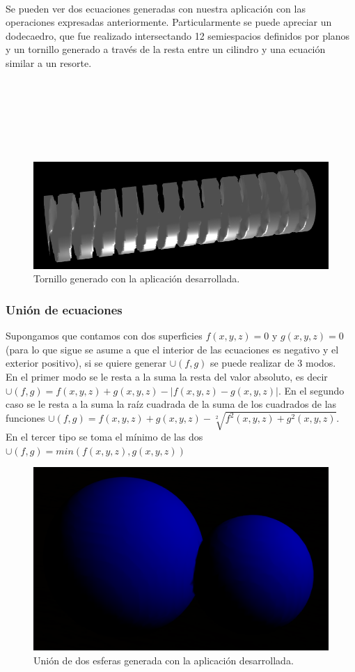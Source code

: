 \documentclass[12pt]{article}
\begin{document}
\\Se pueden ver dos ecuaciones generadas con nuestra aplicación con las operaciones expresadas anteriormente. Particularmente se puede apreciar un dodecaedro, que fue realizado intersectando 12 semiespacios definidos por planos y un tornillo generado a través de la resta entre un cilindro  y una ecuación similar a un resorte.
\\
\\
\\
\\
\\
\\
\\

\begin{figure}[h]
\includegraphics[width=0.7\linewidth,center]{tornillo.png}
\caption{Tornillo generado con la aplicación desarrollada.}
\end{figure}
\clearpage
\subsubsection{Unión de ecuaciones}
Supongamos que contamos con dos superficies $f(x,y,z)=0$ y $g(x,y,z)=0$ (para lo que sigue se asume a que el interior de las ecuaciones es negativo y el exterior positivo), si se quiere generar  $\cup(f,g)$ se puede realizar de 3 modos. 
\\En el primer modo se le resta a la suma la resta del valor absoluto, es decir $\cup(f,g) =  f(x,y,z) + g(x,y,z) - |f(x,y,z) - g(x,y,z)|$. 
 En el segundo caso se le resta a la suma la raíz cuadrada de la suma de los cuadrados de las funciones  $\cup(f,g) = f(x,y,z) + g(x,y,z) -\sqrt[2]{f^2(x,y,z) + g^2(x,y,z)}$.
\\En el tercer tipo se toma el mínimo de las dos  $\cup(f,g)=min(f(x,y,z),g(x,y,z))$
\begin{figure}[h]
\includegraphics[width=0.7\linewidth,center]{oi1.png}
\caption{Unión de dos esferas generada con la aplicación desarrollada.}
\end{figure}
\end{document}
